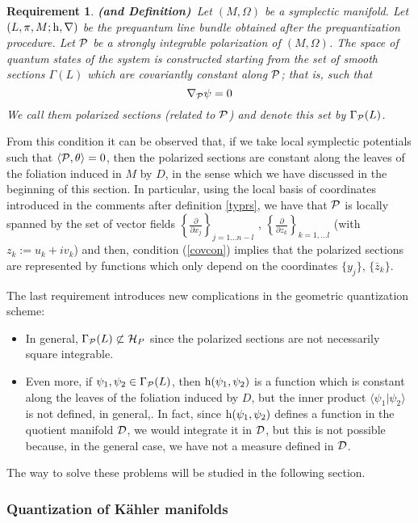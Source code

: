 \documentclass[12pt]{article}
\newtheorem{require}{Requirement}
\def\beq{\begin{equation}}
\def\eeq{\end{equation}}
\def\dst{\(}
\def\derpar#1#2{\frac{\partial{#1}}{\partial{#2}}}
\def\P{{\cal P}}
\def\D{{\cal D}}
\def\H{{\cal H}}
\def\h{{\rm h}}
\begin{document}
\begin{require}
{\bf (and Definition)}\
Let $(M,\Omega )$ be a symplectic manifold.
Let $(L,\pi ,M;\h ,\nabla )$ be the prequantum line bundle
obtained after the prequantization procedure.
Let $\P$ be a strongly integrable polarization
of $(M,\Omega )$.
The space of quantum states of the system
is constructed starting from the set of smooth sections $\Gamma (L)$
which are {\it covariantly constant} along $\P$;
that is, such that
\beq
\nabla_\P\psi = 0
\label{covcon}
\eeq
We call them
{\rm polarized sections} (related to $\P$)
and denote this set by $\Gamma_\P (L)$.
\label{polsec}
\end{require}

  From this condition it can be observed that,
if we take local symplectic potentials such that
$\langle \P , \theta \rangle = 0$,
then the polarized sections are constant
along the leaves of the foliation induced in $M$ by $D$,
in the sense which we have discussed in the beginning of this section.
In particular, using the local basis of coordinates introduced
in the comments after definition \ref{typrs},
we have that $\P$ is locally spanned by the set of vector fields
\dst\left\{ \derpar{}{x_j} \right\}_{j=1 \ldots n-l}\) ,
\dst\left\{ \derpar{}{z_k} \right\}_{k=1,\ldots l}\)
(with $z_k := u_k + i v_k$) and then,
condition (\ref{covcon}) implies that the polarized sections
are represented by functions which only depend on
the coordinates $\{ y_j \}$, $\{\bar z_k \}$.

The last requirement introduces new complications
in the geometric quantization scheme:
\begin{itemize}
\item
In general, $\Gamma_\P (L) \not\subset \H_P$
since the polarized sections are not necessarily square integrable.
\item
Even more, if
$\psi_1,\psi_2 \in \Gamma_\P (L)$,
then $\h (\psi_1,\psi_2)$ is a function which
is constant along the leaves of the foliation
induced by $D$, but the inner product
$\langle \psi_1 | \psi_2 \rangle$
is not defined, in general,.
In fact, since $\h (\psi_1,\psi_2)$
defines a function in the quotient manifold $\D$,
we would integrate it in $\D$,
but this is not possible because, in the general case, we have not
a measure defined in $\D$.
\end{itemize}
The way to solve these problems will be studied in the following
section.


\subsubsection{Quantization of K\"ahler manifolds}
\end{document}
